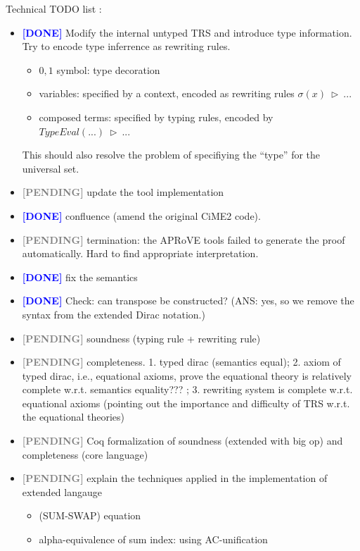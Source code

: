 \documentclass[manuscript, review, timestamp]{acmart}
\newcommand*{\reduce}{\ \triangleright\ }
\newcommand*{\done}{\textcolor{blue}{\textbf{ [DONE] }}}
\newcommand*{\pending}{\textcolor{gray}{\textbf{ [PENDING] }}}
\begin{document}
Technical TODO list :
\begin{itemize}
    \item \done Modify the internal untyped TRS and introduce type information. Try to encode type inferrence as rewriting rules.
        \begin{itemize}
            \item $0, 1$ symbol: type decoration
            \item variables: specified by a context, encoded as rewriting rules $\sigma(x) \reduce ...$
            \item composed terms: specified by typing rules, encoded by $TypeEval(...) \reduce ...$
        \end{itemize}
        This should also resolve the problem of specifiying the ``type'' for the universal set.
    \item \pending update the tool implementation
    \item \done confluence (amend the original CiME2 code).
    \item \pending termination: the APRoVE tools failed to generate the proof automatically. Hard to find appropriate interpretation. 
    \item \done fix the semantics
    \item \done Check: can transpose be constructed? (ANS: yes, so we remove the syntax from the extended Dirac notation.)
    \item \pending soundness (typing rule + rewriting rule)
    \item \pending completeness. 1. typed dirac (semantics equal); 2. axiom of typed dirac, i.e., equational axioms, prove the equational theory is relatively complete w.r.t. semantics equality??? ; 3. rewriting system is complete w.r.t. equational axioms (pointing out the importance and difficulty of TRS w.r.t. the equational theories)
    \item \pending Coq formalization of soundness (extended with big op) and completeness (core language)
    \item \pending explain the techniques applied in the implementation of extended langauge
        \begin{itemize}
            \item (SUM-SWAP) equation
            \item alpha-equivalence of sum index: using AC-unification

\end{itemize}
\end{itemize}
\end{document}
